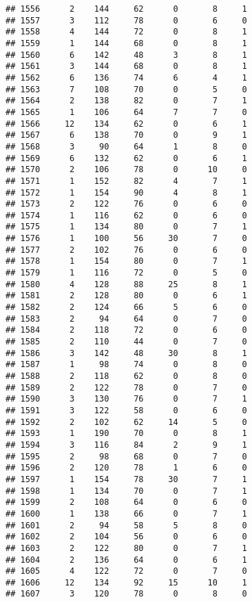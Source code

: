 \documentclass[
]{article}
\begin{document}
\begin{verbatim}
## 1556      2    144     62      0       8     1
## 1557      3    112     78      0       6     0
## 1558      4    144     72      0       8     1
## 1559      1    144     68      0       8     1
## 1560      6    142     48      3       8     1
## 1561      3    144     68      0       8     1
## 1562      6    136     74      6       4     1
## 1563      7    108     70      0       5     0
## 1564      2    138     82      0       7     1
## 1565      1    106     64      7       7     0
## 1566     12    134     62      0       6     1
## 1567      6    138     70      0       9     1
## 1568      3     90     64      1       8     0
## 1569      6    132     62      0       6     1
## 1570      2    106     78      0      10     0
## 1571      1    152     82      4       7     1
## 1572      1    154     90      4       8     1
## 1573      2    122     76      0       6     0
## 1574      1    116     62      0       6     0
## 1575      1    134     80      0       7     1
## 1576      1    100     56     30       7     0
## 1577      2    102     76      0       6     0
## 1578      1    154     80      0       7     1
## 1579      1    116     72      0       5     0
## 1580      4    128     88     25       8     1
## 1581      2    128     80      0       6     1
## 1582      2    124     66      5       6     0
## 1583      2     94     64      0       7     0
## 1584      2    118     72      0       6     0
## 1585      2    110     44      0       7     0
## 1586      3    142     48     30       8     1
## 1587      1     98     74      0       8     0
## 1588      2    118     62      0       8     0
## 1589      2    122     78      0       7     0
## 1590      3    130     76      0       7     1
## 1591      3    122     58      0       6     0
## 1592      2    102     62     14       5     0
## 1593      1    190     70      0       8     1
## 1594      3    116     84      2       9     1
## 1595      2     98     68      0       7     0
## 1596      2    120     78      1       6     0
## 1597      1    154     78     30       7     1
## 1598      1    134     70      0       7     1
## 1599      2    108     64      0       6     0
## 1600      1    138     66      0       7     1
## 1601      2     94     58      5       8     0
## 1602      2    104     56      0       6     0
## 1603      2    122     80      0       7     1
## 1604      2    136     64      0       6     1
## 1605      4    122     72      0       7     0
## 1606     12    134     92     15      10     1
## 1607      3    120     78      0       8     0

\end{verbatim}
\end{document}
